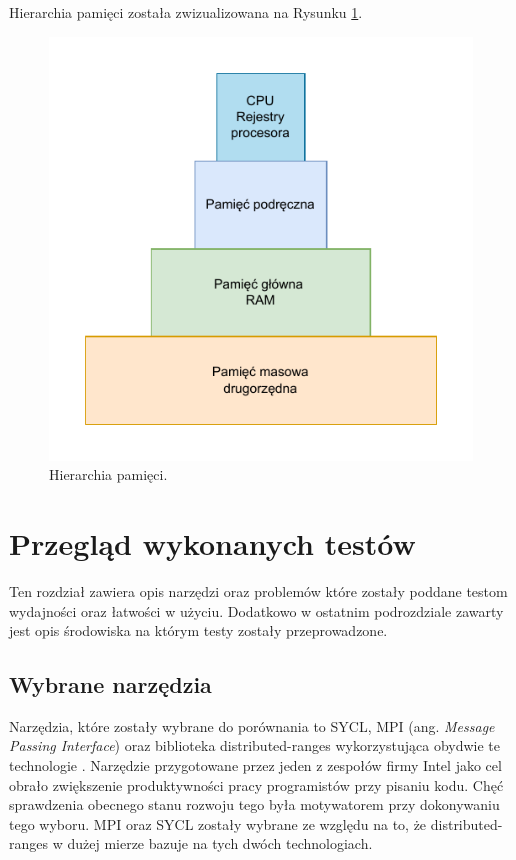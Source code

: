 \documentclass[a4paper,12pt]{book} %
\begin{document}
Hierarchia pamięci została zwizualizowana na Rysunku \ref{fig:hierarchia_pamieci}.
\begin{figure}[h]
	\centering
	\includegraphics[scale=1]{assets/hierarchia_pamieci.pdf}
	\caption{Hierarchia pamięci.}
	\label{fig:hierarchia_pamieci}
\end{figure}

\chapter{Przegląd wykonanych testów}
Ten rozdział zawiera opis narzędzi oraz problemów które zostały poddane testom wydajności oraz łatwości w użyciu. Dodatkowo w ostatnim podrozdziale zawarty jest opis środowiska na którym testy zostały przeprowadzone.
\section{Wybrane narzędzia}
Narzędzia, które zostały wybrane do porównania to SYCL, MPI (ang. \emph{Message Passing Interface}) oraz biblioteka distributed-ranges wykorzystująca obydwie te technologie \cite{SYCL, MPI, dist-ranges}. Narzędzie przygotowane przez jeden z zespołów firmy Intel jako cel obrało zwiększenie produktywności pracy programistów przy pisaniu kodu. Chęć sprawdzenia obecnego stanu rozwoju tego była motywatorem przy dokonywaniu tego wyboru. MPI oraz SYCL zostały wybrane ze względu na to, że distributed-ranges w dużej mierze bazuje na tych dwóch technologiach.
\end{document}
